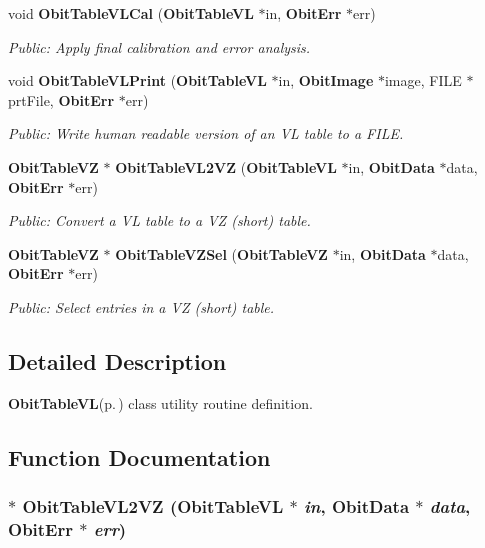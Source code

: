 \begin{CompactItemize}
void {\bf Obit\-Table\-VLCal} ({\bf Obit\-Table\-VL} $\ast$in, {\bf Obit\-Err} $\ast$err)
\begin{CompactList}\small\item\em Public: Apply final calibration and error analysis. \item\end{CompactList}\item 
void {\bf Obit\-Table\-VLPrint} ({\bf Obit\-Table\-VL} $\ast$in, {\bf Obit\-Image} $\ast$image, FILE $\ast$prt\-File, {\bf Obit\-Err} $\ast$err)
\begin{CompactList}\small\item\em Public: Write human readable version of an VL table to a FILE. \item\end{CompactList}\item 
{\bf Obit\-Table\-VZ} $\ast$ {\bf Obit\-Table\-VL2VZ} ({\bf Obit\-Table\-VL} $\ast$in, {\bf Obit\-Data} $\ast$data, {\bf Obit\-Err} $\ast$err)
\begin{CompactList}\small\item\em Public: Convert a VL table to a VZ (short) table. \item\end{CompactList}\item 
{\bf Obit\-Table\-VZ} $\ast$ {\bf Obit\-Table\-VZSel} ({\bf Obit\-Table\-VZ} $\ast$in, {\bf Obit\-Data} $\ast$data, {\bf Obit\-Err} $\ast$err)
\begin{CompactList}\small\item\em Public: Select entries in a VZ (short) table. \item\end{CompactList}\end{CompactItemize}


\subsection{Detailed Description}
{\bf Obit\-Table\-VL}{\rm (p.\,\pageref{structObitTableVL})} class utility routine definition. 



\subsection{Function Documentation}
\subsubsection{$\ast$ Obit\-Table\-VL2VZ ({\bf Obit\-Table\-VL} $\ast$ {\em in}, {\bf Obit\-Data} $\ast$ {\em data}, {\bf Obit\-Err} $\ast$ {\em err})}\label{ObitTableVLUtil_8h_a8}


